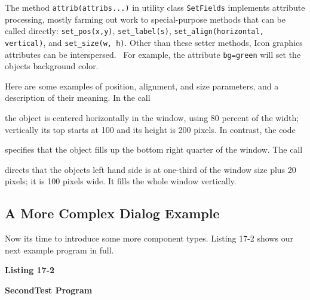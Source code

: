 The method \texttt{attrib(attribs...)} in utility class
\texttt{SetFields} implements attribute
processing, mostly farming out work to special-purpose methods
that can be called directly: \texttt{set\_pos(x,y)},
\texttt{set\_label(s)}, \texttt{set\_align(horizontal, vertical)}, and
\texttt{set\_size(w, }\texttt{h)}. Other than these setter methods,
Icon graphics attributes can be interspersed. \ For example, the
attribute \texttt{{\textquotedbl}bg=green{\textquotedbl}} will set the
object{\textquotesingle}s background color.

Here are some examples of position, alignment, and size parameters, and
a description of their meaning. In the call


\noindent
the object is centered horizontally in the window, using 80
percent of the width; vertically its top starts at 100 and its
height is 200 pixels. In contrast, the code


\noindent
specifies that the object fills up the bottom right quarter of the
window. The call


\noindent
directs that the object{\textquotesingle}s left hand side is at
one-third of the window size plus 20 pixels; it is 100 pixels wide. It
fills the whole window vertically.

\subsection{A More Complex Dialog Example}

Now it{\textquotesingle}s time to introduce some more component types.
Listing 17-2 shows our next example program in full.

\bigskip

{\sffamily\bfseries
Listing 17-2}

{\sffamily\bfseries
SecondTest Program}

